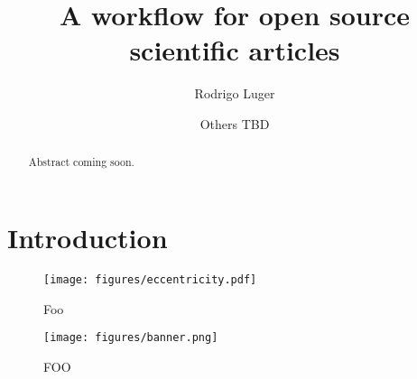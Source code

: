 \documentclass[twocolumn]{aastex631}
\begin{document}
\title{A workflow for open source scientific articles}

\author[0000-0002-0296-3826]{Rodrigo Luger}
\author{Others TBD}

\begin{abstract}
    Abstract coming soon.
\end{abstract}

\section{Introduction}
\label{sec:intro}

\begin{figure}[ht!]
    \begin{centering}
        \texttt{[image: figures/eccentricity.pdf]}
        \caption{Foo}
        \label{fig:eccentricity}
    \end{centering}
\end{figure}

\begin{figure}[th!]
    \begin{centering}
        \texttt{[image: figures/banner.png]}
        \caption{FOO}
        \label{fig:banner}
    \end{centering}
\end{figure}


\end{document}
